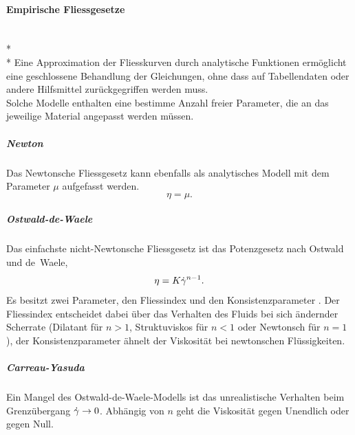 %
\paragraph{Empirische Fliessgesetze}~\\*~\\*
Eine Approximation der Fliesskurven durch analytische Funktionen er\-mög\-licht eine geschlossene Behandlung der Gleichungen, ohne dass auf Tabellendaten oder andere Hilfsmittel zurückgegriffen werden muss.\\
Solche Modelle enthalten eine bestimme Anzahl freier Parameter, die an das jeweilige Material angepasst werden müssen.
\subparagraph{Newton}
Das Newtonsche Fliessgesetz kann ebenfalls als analytisches Modell mit dem Parameter $\mu$ aufgefasst werden.
\begin{equation}
    \eta = \mu.
    \label{eq:fg:newton}
\end{equation}
\subparagraph{Ostwald-de-Waele}
Das einfachste nicht-Newtonsche Fliessgesetz ist das Potenzgesetz nach Ostwald und de~Waele,
\begin{equation}
    \eta=K\dot\gamma^{n-1}.
    \label{eq:fg:potenz}
\end{equation}
Es besitzt zwei Parameter, den Fliessindex  und den Konsistenzparameter . Der Fliessindex entscheidet dabei über das Verhalten des Fluids bei sich ändernder Scherrate (Dilatant für $n>1$, Struktuviskos für $n<1$ oder Newtonsch für $n=1$), der Konsistenzparameter ähnelt der Viskosität bei newtonschen Flüssigkeiten.
%
\subparagraph{Carreau-Yasuda}
Ein Mangel des Ostwald-de-Waele-Modells ist das unrealistische Verhalten beim Grenzübergang $\dot\gamma\rightarrow 0$. Abhängig von $n$ geht die Viskosität gegen Unendlich oder gegen Null.
